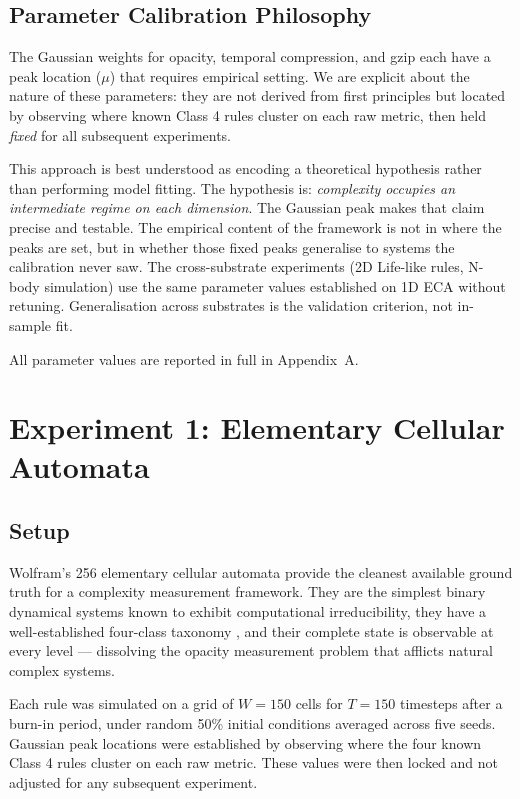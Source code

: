\documentclass[12pt,a4paper]{article}
\begin{document}
\subsection{Parameter Calibration Philosophy}

The Gaussian weights for opacity, temporal compression, and gzip each
have a peak location ($\mu$) that requires empirical setting.
We are explicit about the nature of these parameters: they are not
derived from first principles but located by observing where known Class
4 rules cluster on each raw metric, then held \emph{fixed} for all
subsequent experiments.

This approach is best understood as encoding a theoretical hypothesis
rather than performing model fitting.
The hypothesis is: \emph{complexity occupies an intermediate regime on
each dimension}.
The Gaussian peak makes that claim precise and testable.
The empirical content of the framework is not in where the peaks are
set, but in whether those fixed peaks generalise to systems the
calibration never saw.
The cross-substrate experiments (2D Life-like rules, N-body simulation)
use the same parameter values established on 1D ECA without retuning.
Generalisation across substrates is the validation criterion, not
in-sample fit.

All parameter values are reported in full in Appendix~A.

\section{Experiment 1: Elementary Cellular Automata}

\subsection{Setup}

Wolfram's 256 elementary cellular automata provide the cleanest
available ground truth for a complexity measurement framework.
They are the simplest binary dynamical systems known to exhibit
computational irreducibility, they have a well-established four-class
taxonomy \citep{wolfram2002}, and their complete state is observable
at every level — dissolving the opacity measurement problem that afflicts
natural complex systems.

Each rule was simulated on a grid of $W = 150$ cells for $T = 150$
timesteps after a burn-in period, under random 50\% initial conditions
averaged across five seeds.
Gaussian peak locations were established by observing where the four
known Class 4 rules cluster on each raw metric.
These values were then locked and not adjusted for any subsequent
experiment.
\end{document}
